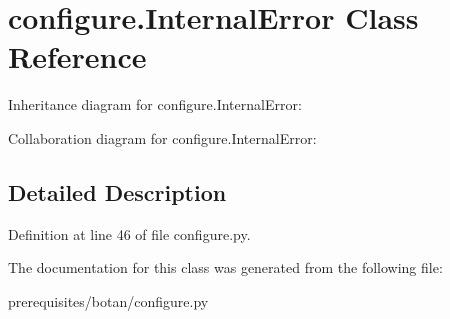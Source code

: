 \hypertarget{classconfigure_1_1_internal_error}{}\section{configure.\+Internal\+Error Class Reference}
\label{classconfigure_1_1_internal_error}


Inheritance diagram for configure.\+Internal\+Error\+:


Collaboration diagram for configure.\+Internal\+Error\+:


\subsection{Detailed Description}


Definition at line 46 of file configure.\+py.



The documentation for this class was generated from the following file\+:\begin{DoxyCompactItemize}
\item 
prerequisites/botan/configure.\+py\end{DoxyCompactItemize}
